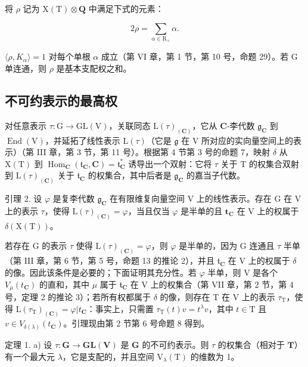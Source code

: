 将 \(\rho\) 记为 \(\mathrm{X(T)}\otimes \mathbf{Q}\) 中满足下式的元素：

\[
2 \rho = \sum_ {\alpha \in \mathrm{R} _ {+}} \alpha .
\]

\(\langle\rho,K_{\alpha}\rangle=1\) 对每个单根 \(\alpha\) 成立（第 VI 章，第 1 节，第 10 号，命题 29）。若 G 单连通，则 \(\rho\) 是基本支配权之和。

\subsection{不可约表示的最高权}

对任意表示 \(\tau : \mathrm{G} \to \mathrm{GL}(\mathrm{V})\)，关联同态 \(\mathrm{L}(\tau)_{(\mathbf{C})}\)，它从 \(\mathbf{C}\)-李代数 \(\mathfrak{g}_{\mathbf{C}}\) 到 \(\operatorname{End}(\mathrm{V})\)，并延拓了线性表示 \(\mathrm{L}(\tau)\)（它是 \(\mathfrak{g}\) 在 V 所对应的实向量空间上的表示）（第 III 章，第 3 节，第 11 号）。根据第 4 节第 3 号的命题 7，映射 \(\delta\) 从 \(\mathrm{X}(\mathrm{T})\) 到 \(\operatorname{Hom}_{\mathbf{C}}(\mathfrak{t}_{\mathbf{C}}, \mathbf{C}) = \mathfrak{t}_{\mathbf{C}}^{*}\) 诱导出一个双射：它将 \(\tau\) 关于 T 的权集合双射到 \(\mathrm{L}(\tau)_{(\mathbf{C})}\) 关于 \(\mathfrak{t}_{\mathbf{C}}\) 的权集合，其中后者是 \(\mathfrak{g}_{\mathbf{C}}\) 的嘉当子代数。

引理 2. 设 \(\varphi\) 是复李代数 \(\mathfrak{g}_{\mathbf{C}}\) 在有限维复向量空间 V 上的线性表示。存在 G 在 V 上的表示 \(\tau\)，使得 \(\mathrm{L}(\tau)_{(\mathbf{C})} = \varphi\)，当且仅当 \(\varphi\) 是半单的且 \(\mathbf{t}_{\mathbf{C}}\) 在 V 上的权属于 \(\delta (\mathrm{X(T)})\)。

若存在 G 的表示 \(\tau\) 使得 \(\mathrm{L}(\tau)_{(\mathbf{C})} = \varphi\)，则 \(\varphi\) 是半单的，因为 G 连通且 \(\tau\) 半单（第 III 章，第 6 节，第 5 号，命题 13 的推论 2），并且 \(\mathfrak{t}_{\mathbf{C}}\) 在 V 上的权属于 \(\delta\) 的像。因此该条件是必要的；下面证明其充分性。若 \(\varphi\) 半单，则 V 是各个 \(V_{\mu}(t_{\mathbf{C}})\) 的直和，其中 \(\mu\) 属于 \(\mathfrak{t}_{\mathbf{C}}\) 在 V 上的权集合（第 VII 章，第 2 节，第 4 号，定理 2 的推论 3）；若所有权都属于 \(\delta\) 的像，则存在 T 在 V 上的表示 \(\tau_{\mathrm{T}}\)，使得 \(\mathrm{L}(\tau_{\mathrm{T}})_{(\mathbf{C})} = \varphi |t_{\mathbf{C}}\)：事实上，只需置 \(\tau_{\mathrm{T}}(t)v = t^{\lambda}v\)，其中 \(t \in \mathrm{T}\) 且 \(v \in V_{\delta(\lambda)}(t_{\mathbf{C}})\)。引理现由第 2 节第 6 号命题 8 得到。

定理 1. a) 设 \(\tau : \mathbf{G} \to \mathbf{GL}(\mathbf{V})\) 是 \(\mathbf{G}\) 的不可约表示。则 \(\tau\) 的权集合（相对于 \(\mathbf{T}\)）有一个最大元 \(\lambda\)，它是支配的，并且空间 \(\mathrm{V}_{\lambda}(\mathrm{T})\) 的维数为 1。

